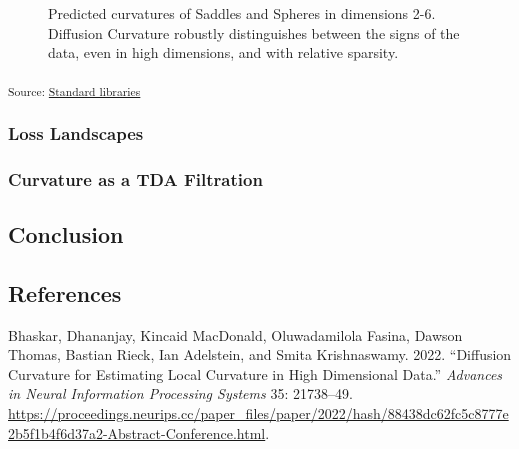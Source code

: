 \documentclass[
  letterpaper,
  DIV=11,
  numbers=noendperiod]{scrartcl}
\newlength{\cslhangindent}
\newenvironment{CSLReferences}[2] %
 {\begin{list}{}{%
  \setlength{\itemindent}{0pt}
  \setlength{\leftmargin}{0pt}
  \setlength{\parsep}{0pt}
  \ifodd #1
   \setlength{\leftmargin}{\cslhangindent}
   \setlength{\itemindent}{-1\cslhangindent}
  \fi
  \setlength{\itemsep}{#2\baselineskip}}}
 {\end{list}}
\begin{document}
\begin{figure}[H]
{}

\caption{\label{fig-sadspheres}Predicted curvatures of Saddles and
Spheres in dimensions 2-6. Diffusion Curvature robustly distinguishes
between the signs of the data, even in high dimensions, and with
relative sparsity.}

\end{figure}%

\textsubscript{Source:
\href{https://professorwug.github.io/diffusion-curvature//home/piriac/Pumberton/Workshop/21-SUMRY-Curvature/diffusion-curvature/nbs/experiments/2f-sign-prediction-tests.ipynb.html\#cell-fig-sadspheres}{Standard
libraries}}

\subsubsection{Loss Landscapes}\label{loss-landscapes}

\subsubsection{Curvature as a TDA
Filtration}\label{curvature-as-a-tda-filtration}

\subsection{Conclusion}\label{conclusion}

\subsection*{References}\label{references}

\label{refs}
\begin{CSLReferences}{1}{0}
Bhaskar, Dhananjay, Kincaid MacDonald, Oluwadamilola Fasina, Dawson
Thomas, Bastian Rieck, Ian Adelstein, and Smita Krishnaswamy. 2022.
{``Diffusion Curvature for Estimating Local Curvature in High
Dimensional Data.''} \emph{Advances in Neural Information Processing
Systems} 35: 21738--49.
\url{https://proceedings.neurips.cc/paper_files/paper/2022/hash/88438dc62fc5c8777e2b5f1b4f6d37a2-Abstract-Conference.html}.

\end{CSLReferences}
\end{document}
